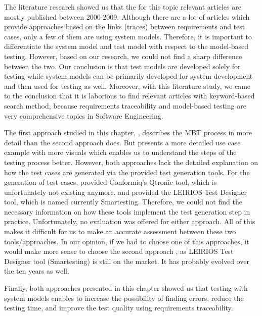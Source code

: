 The literature research showed us that the for this topic relevant articles are mostly published between 2000-2009. Although there are a lot of articles which provide approaches based on the links (traces) between requirements and test cases, only a few of them are using system models. Therefore, it is important to differentiate the system model and test model with respect to the model-based testing. However, based on our research, we could not find a sharp difference between the two. Our conclusion is that test models are developed solely for testing while system models can be primarily developed for system development and then used for testing as well. Moreover, with this literature study, we came to the conclusion that it is laborious to find relevant articles with keyword-based search method, because requirements traceability and model-based testing are very comprehensive topics in Software Engineering. 

The first approach studied in this chapter, \cite{Paper1}, describes the MBT process in more detail than the second approach \cite{Paper2} does. But \cite{Paper2} presents a more detailed use case example with more visuals which enables us to understand the steps of the testing process better. However, both approaches lack the detailed explanation on how the test cases are generated via the provided test generation tools. For the generation of test cases, \cite{Paper1} provided Conformiq's Qtronic tool, which is unfortunately not existing anymore, and \cite{Paper2} provided the LEIRIOS Test Designer tool, which is named currently Smartesting. Therefore, we could not find the necessary information on how these tools implement the test generation step in practice. Unfortunately, no evaluation was offered for either approach. All of this makes it difficult for us to make an accurate assessment between these two tools/approaches. In our opinion, if we had to choose one of this approaches, it would make more sense to choose the second approach \cite{Paper2}, as LEIRIOS Test Designer tool (Smartesting) is still on the market. It has probably evolved over the ten years as well.

Finally, both approaches presented in this chapter showed us that testing with system models enables to increase the possibility of finding errors, reduce the testing time, and improve the test quality using requirements traceability.
